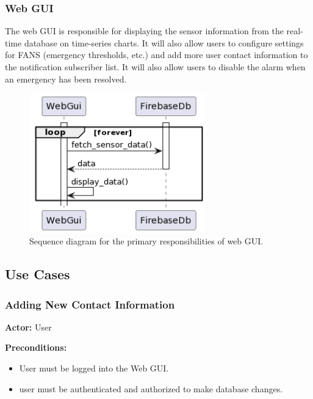 \subsubsection{Web GUI}

The web GUI is responsible for displaying the sensor information from the real-time database on time-series charts. It
will also allow users to configure settings for FANS (emergency thresholds, etc.) and add more user contact information
to the notification subscriber list. It will also allow users to disable the alarm when an emergency has been resolved.

\begin{figure}[H]
    \centering
    \includegraphics[width=3in]{../assets/WebGUiSequence.png}
    \caption{Sequence diagram for the primary responsibilities of web GUI.}
    \label{fig:webui-sq}
\end{figure}

\subsection{Use Cases} \label{s:use-cases}

\subsubsection{Adding New Contact Information}

\textbf{Actor:} User

\textbf{Preconditions:}
\begin{itemize}
    \item User must be logged into the Web GUI.
    \item user must be authenticated and authorized to make database changes.
\end{itemize}

